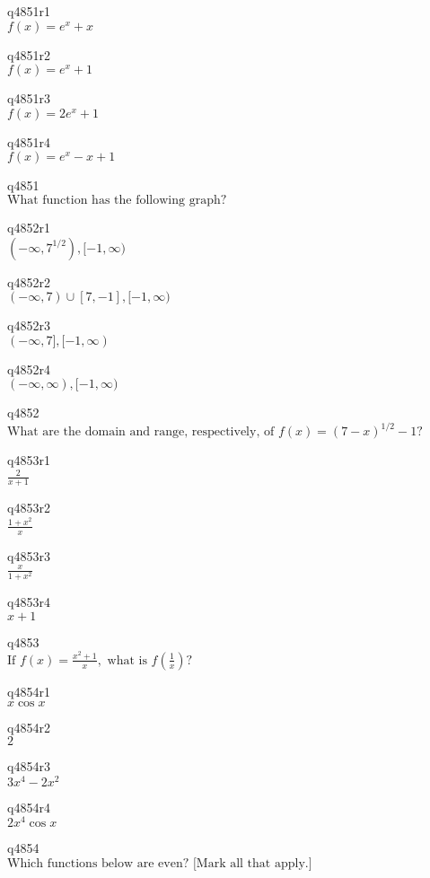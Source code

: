 q4851r1\\
\(\displaystyle f(x) = e^x + x \)

q4851r2\\
\(\displaystyle f(x) = e^x + 1 \)

q4851r3\\
\(\displaystyle f(x) = 2e^x + 1 \)

q4851r4\\
\(\displaystyle f(x) = e^x - x + 1 \)

q4851\\
\(\displaystyle \text{What function has the following graph?} \)

q4852r1\\
\(\displaystyle (-\infty, 7^{1/2}), [-1, \infty) \)

q4852r2\\
\(\displaystyle (-\infty, 7) \cup [7, -1], [-1, \infty) \)

q4852r3\\
\(\displaystyle (-\infty, 7], [-1, \infty) \)

q4852r4\\
\(\displaystyle (-\infty, \infty), [-1, \infty) \)

q4852\\
\(\displaystyle \text{What are the domain and range, respectively, of } f(x) = (7-x)^{1/2} - 1? \)

q4853r1\\
\(\displaystyle \frac{2}{x+1} \)

q4853r2\\
\(\displaystyle \frac{1+x^2}{x} \)

q4853r3\\
\(\displaystyle \frac{x}{1 + x^2} \)

q4853r4\\
\(\displaystyle x + 1 \)

q4853\\
\(\displaystyle \text{If } f(x) = \frac{x^2 + 1}{x}, \text{ what is } f \left ( \frac{1}{x} \right ) ? \)

q4854r1\\
\(\displaystyle x \cos x \)

q4854r2\\
\(\displaystyle 2 \)

q4854r3\\
\(\displaystyle 3x^4 - 2x^2 \)

q4854r4\\
\(\displaystyle 2x^4 \cos x \)

q4854\\
\(\displaystyle \text{Which functions below are even? [Mark all that apply.]} \)

